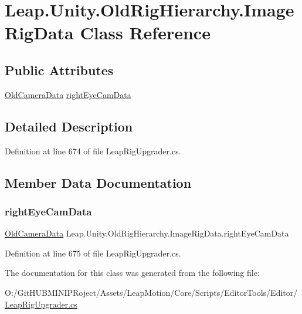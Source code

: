 \hypertarget{class_leap_1_1_unity_1_1_old_rig_hierarchy_1_1_image_rig_data}{}\section{Leap.\+Unity.\+Old\+Rig\+Hierarchy.\+Image\+Rig\+Data Class Reference}
\label{class_leap_1_1_unity_1_1_old_rig_hierarchy_1_1_image_rig_data}
\subsection*{Public Attributes}
\begin{DoxyCompactItemize}
\item 
\mbox{\hyperlink{class_leap_1_1_unity_1_1_old_rig_hierarchy_1_1_old_camera_data}{Old\+Camera\+Data}} \mbox{\hyperlink{class_leap_1_1_unity_1_1_old_rig_hierarchy_1_1_image_rig_data_a25435730115c2e77c28a9fbed72c1446}{right\+Eye\+Cam\+Data}}
\end{DoxyCompactItemize}


\subsection{Detailed Description}


Definition at line 674 of file Leap\+Rig\+Upgrader.\+cs.



\subsection{Member Data Documentation}
\mbox{\label{class_leap_1_1_unity_1_1_old_rig_hierarchy_1_1_image_rig_data_a25435730115c2e77c28a9fbed72c1446}} 
\subsubsection{\texorpdfstring{rightEyeCamData}{rightEyeCamData}}
{\footnotesize\ttfamily \mbox{\hyperlink{class_leap_1_1_unity_1_1_old_rig_hierarchy_1_1_old_camera_data}{Old\+Camera\+Data}} Leap.\+Unity.\+Old\+Rig\+Hierarchy.\+Image\+Rig\+Data.\+right\+Eye\+Cam\+Data}



Definition at line 675 of file Leap\+Rig\+Upgrader.\+cs.



The documentation for this class was generated from the following file\+:\begin{DoxyCompactItemize}
\item 
O\+:/\+Git\+H\+U\+B\+M\+I\+N\+I\+P\+Roject/\+Assets/\+Leap\+Motion/\+Core/\+Scripts/\+Editor\+Tools/\+Editor/\mbox{\hyperlink{_leap_rig_upgrader_8cs}{Leap\+Rig\+Upgrader.\+cs}}\end{DoxyCompactItemize}
